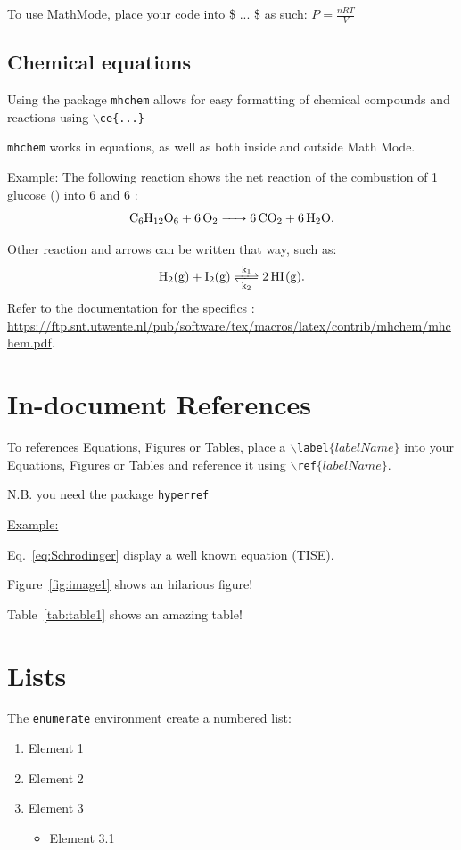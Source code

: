 \documentclass{article}
\begin{document}
To use MathMode, place your code into \$ ... \$ as such: $P=\frac{nRT}{V}$

\subsection{Chemical equations}

Using the package \texttt{mhchem} allows for easy formatting of chemical compounds and reactions using \texttt{$\backslash$ce\{...\}}

\texttt{mhchem} works in equations, as well as both inside and outside Math Mode.

Example:
The following reaction shows the net reaction of the combustion of 1 glucose () into 6  and 6 :
\begin{equation}
    \ce{C6H12O6 + 6O2 -> 6CO2 + 6H2O}.
\end{equation}

Other reaction and arrows can be written that way, such as: 
$$\ce{H2(g) + I2(g) <=>[{k_1}][{k_2}] 2HI(g)}.$$
Refer to the documentation for the specifics
: \url{https://ftp.snt.utwente.nl/pub/software/tex/macros/latex/contrib/mhchem/mhchem.pdf}.

\section{In-document References}
To references Equations, Figures or Tables, place a \texttt{$\backslash$label$\{labelName\}$}
into your Equations, Figures or Tables and reference it using  \texttt{$\backslash$ref$\{labelName\}$}.

N.B. you need the package \texttt{hyperref}

\underline{Example:}

Eq.~\ref{eq:Schrodinger} display a well known equation (TISE).

Figure~\ref{fig:image1} shows an hilarious figure!

Table~\ref{tab:table1} shows an amazing table!




\section{Lists}

The \texttt{enumerate} environment create a numbered list:
\begin{enumerate}
    \item Element 1  
    \item Element 2
    \item Element 3
    \begin{itemize}
        \item Element 3.1
    \end{itemize}
\end{enumerate}
\end{document}

